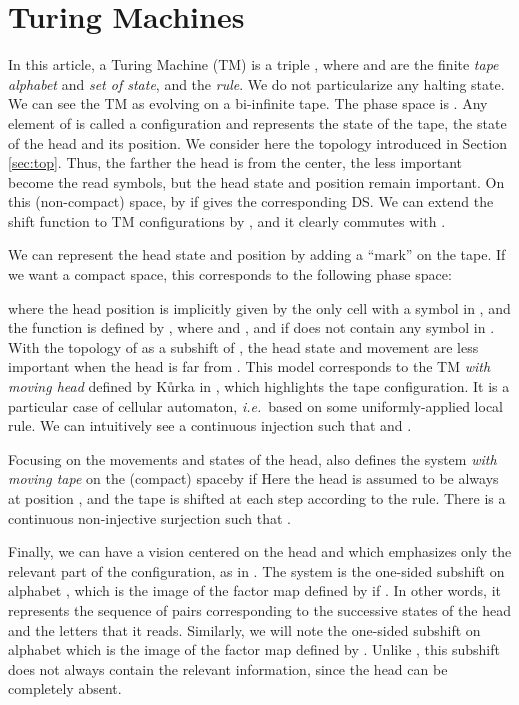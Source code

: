 \documentclass{llncs}
\newcommand{\ie}{\textit{i.e.}\ }
\begin{document}
\section{Turing Machines}
In this article, a Turing Machine (TM) is a triple , where  and  are the finite \emph{tape alphabet} and \emph{set of state}, and  the \emph{rule}.
We do not particularize any halting state.
We can see the TM as evolving on a bi-infinite tape.
The phase space is .
Any element of  is called a configuration and represents the state of the tape, the state of the head and its position.
We consider here the topology introduced in Section \ref{sec:top}.
Thus, the farther the head is from the center, the less important become the read symbols, but the head state and position remain important.
On this (non-compact) space,  by  if  gives the corresponding DS.
We can extend the shift function to TM configurations by , and it clearly commutes with .

We can represent the head state and position by adding a ``mark'' on the tape.
If we want a compact space, this corresponds to the following phase space:

where the head position is implicitly given by the only cell with a symbol in , and the function  is defined by , where  and , and  if  does not contain any symbol in .
With the topology of  as a subshift of , the head state and movement are less important when the head is far from .
This model corresponds to the TM \emph{with moving head} defined by K\r urka in \cite{Kurk}, which highlights the tape configuration. It is a particular case of cellular automaton, \ie based on some uniformly-applied local rule.
We can intuitively see a continuous injection  such that  and .

Focusing on the movements and states of the head, \cite{Kurk} also defines the system \emph{with moving tape}  on the (compact) space\break  by  if 
Here the head is assumed to be always at position , and the tape is shifted at each step according to the rule.
There is a continuous non-injective surjection  such that .

Finally, we can have a vision centered on the head and which emphasizes only the relevant part of the configuration, as in \cite{Gaja07,GajaJAC}.
The system  is the one-sided subshift on alphabet , which is the image of the factor map  defined by  if .
In other words, it represents the sequence of pairs corresponding to the successive states of the head and the letters that it reads.
{
}
Similarly, we will note  the one-sided subshift on alphabet  which is the image of the factor map  defined by . Unlike , this subshift does not always contain the relevant information, since the head can be completely absent.
\end{document}
